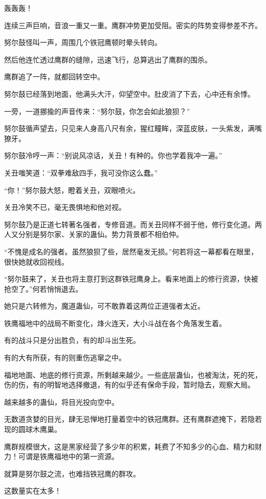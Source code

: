 \begin{this_body}
轰轰轰！

连续三声巨响，音浪一重又一重。鹰群冲势更加受阻。密实的阵势变得参差不齐。

努尔鼓怪叫一声，周围几个铁冠鹰顿时晕头转向。

然后他连忙透过鹰群的缝隙，迅速飞行，总算逃出了鹰群的围杀。

鹰群追了一阵，就都回转空中。

努尔鼓已经落到地面，他满头大汗，仰望空中。肚皮消了下去，心中还有余悸。

一旁，一道挪揄的声音传来：“努尔鼓，你怎会如此狼狈？”

努尔鼓循声望去，只见来人身高八尺有余，猩红瞳眸，深蓝皮肤，一头紫发，满嘴獠牙。

努尔鼓冷哼一声：“别说风凉话，关丑！有种的。你也学着我冲一遍。”

关丑嗤笑道：“双拳难敌四手，我可没你这么蠢。”

“你！”努尔鼓大怒，瞪着关丑，双眼喷火。

关丑冷笑不已，毫无畏惧地和他对视。

努尔鼓乃是正道七转著名强者，专修音道。而关丑同样不弱于他，修行变化道。两人又分别是努尔家、关家的蛊仙。势力背景都不相伯仲。

“不愧是成名的强者。虽然狼狈了些，居然毫发无损。”何若将这一幕都看在眼里，很快她就收回视线。

“努尔鼓来了，关丑也将主意打到这群铁冠鹰身上。看来地面上的修行资源，快被抢空了。”何若悄悄退去。

她只是六转修为，魔道蛊仙，可不敢靠着这两位正道强者太近。

铁鹰福地中的战局不断变化，烽火连天，大小斗战在各个角落发生着。

有的战斗只是分出胜负，有的却斗出生死。

有的大有所获，有的则重伤逃窜之中。

福地地面、地底的修行资源，所剩越来越少。一些底层蛊仙，也被淘汰，死的死，伤的伤，有的明智地选择撤退，有的似乎还有保命手段，暂时隐去，观察大局。

越来越多的蛊仙，将目光投向空中。

无数道贪婪的目光，肆无忌惮地打量着空中的铁冠鹰群。还有鹰群遮掩下，若隐若现的圆球木鹰巢。

鹰群规模很大，这是黑家经营了多少年的积累，耗费了不知多少的心血、精力和财力！可谓是铁鹰福地中的第一资源。

就算是努尔鼓之流，也难挡铁冠鹰的群攻。

这数量实在太多！


\end{this_body}
